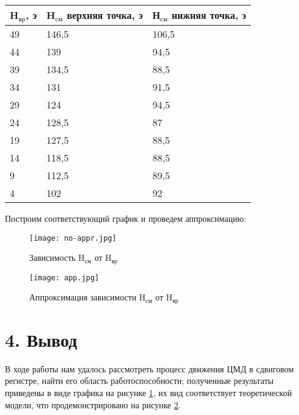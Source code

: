 \documentclass[a4paper,12pt]{report}
\begin{document}
\begin{table}[]
\begin{tabular}{|l|l|l|}
\hline
H$_{\text{вр}}$, э & H$_{\text{см}}$ верхняя точка, э & Н$_{\text{см}}$ нижняя точка, э \\ \hline
49     & 146,5                & 106,5               \\ \hline
44     & 139                  & 94,5                \\ \hline
39     & 134,5                & 88,5                \\ \hline
34     & 131                  & 91,5                \\ \hline
29     & 124                  & 94,5                \\ \hline
24     & 128,5                & 87                  \\ \hline
19     & 127,5                & 88,5                \\ \hline
14     & 118,5                & 88,5                \\ \hline
9      & 112,5                & 89,5                \\ \hline
4      & 102                  & 92                  \\ \hline
\end{tabular}
\end{table}

Построим соответствующий график и проведем аппроксимацию:

\begin{figure}[H]
\centering
\texttt{[image: no-appr.jpg]}
\caption{Зависимость H$_{\text{см}}$ от H$_{\text{вр}}$}
\label{no-appr}
\end{figure}
\begin{figure}[H]
\centering
\texttt{[image: app.jpg]}
\caption{Аппроксимация зависимости H$_{\text{см}}$ от H$_{\text{вр}}$}
\label{appr}
\end{figure}

\section*{4. Вывод}
В ходе работы нам удалось рассмотреть процесс движения ЦМД в сдвиговом регистре, найти его область работоспособности; полученные результаты приведены в виде графика на рисунке \ref{no-appr}, их вид соответствует теоретической модели, что продемонстрировано на рисунке \ref{appr}.

\end{document}
